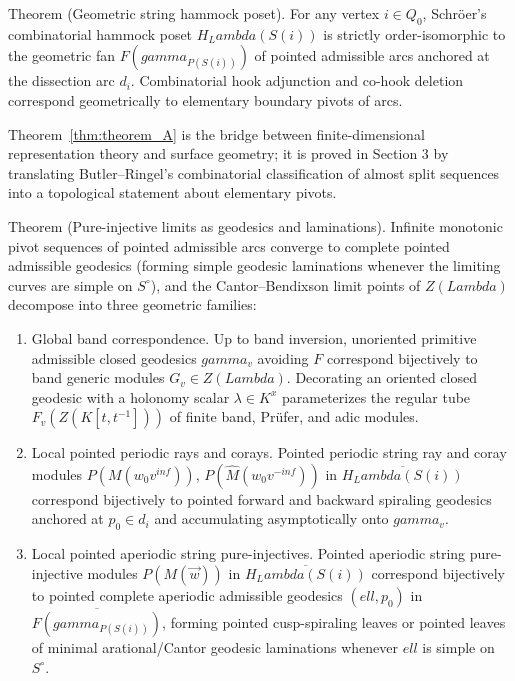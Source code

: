 \documentclass[11pt,a4paper,reqno]{amsart}
\def\mathcal#1{#1}%
\def\mathbb#1{#1}%
\def\operatorname#1{#1}%
\def\K{K}%
\def\forb{F}%
\def\Zg{Z}%
\def\PE{P}%
\def\times{x}%
\def\infty{inf}%
\def\gamma{gamma}%
\def\ell{ell}%
\def\Lambda{Lambda}%
\def\emph#1{#1}%
\def\textbf#1{#1}%
\theoremstyle{definition}
\theoremstyle{remark}
\newcommand{\K}{\mathbb{K}}
\newcommand{\Zg}{\operatorname{Zg}}
\newcommand{\PE}{\operatorname{PE}}
\newcommand{\forb}{\mathfrak{F}}
\begin{document}
\medskip
{}%
\noindent\textbf{Theorem  (Geometric string hammock poset).}%
\label{thm:theorem_A}
\emph{For any vertex $i \in Q_0$, Schr\"oer's combinatorial hammock poset $H_\Lambda(S(i))$ is strictly order-isomorphic to the geometric fan $\mathcal{F}(\gamma_{P(S(i))})$ of pointed admissible arcs anchored at the dissection arc $d_i$. Combinatorial hook adjunction and co-hook deletion correspond geometrically to elementary boundary pivots of arcs.}

\smallskip
Theorem~\ref{thm:theorem_A} is the bridge between finite-dimensional representation theory and surface geometry; it is proved in Section 3 by translating Butler--Ringel's combinatorial classification of almost split sequences into a topological statement about elementary pivots.

\medskip
{}%
\noindent\textbf{Theorem  (Pure-injective limits as geodesics and laminations).}%
\label{thm:theorem_B}
\emph{Infinite monotonic pivot sequences of pointed admissible arcs converge to complete pointed admissible geodesics (forming simple geodesic laminations whenever the limiting curves are simple on $\mathcal{S}^\circ$), and the Cantor--Bendixson limit points of $\Zg(\Lambda)$ decompose into three geometric families:
\begin{enumerate}[label=(\arabic*), leftmargin=*]
\item \textbf{Global band correspondence.} Up to band inversion, unoriented primitive admissible closed geodesics $\gamma_v$ avoiding $\forb$ correspond bijectively to band generic modules $G_v \in \Zg(\Lambda)$. Decorating an oriented closed geodesic with a holonomy scalar $\lambda \in \K^\times$ parameterizes the regular tube $F_v(\Zg(\K[t, t^{-1}]))$ of finite band, Pr\"ufer, and adic modules.
\item \textbf{Local pointed periodic rays and corays.} Pointed periodic string ray and coray modules $\PE(M(w_0 v^{\infty}))$, $\PE(\widehat{M}(w_0 v^{-\infty}))$ in $\overline{H_\Lambda(S(i))}$ correspond bijectively to pointed forward and backward spiraling geodesics anchored at $p_0 \in d_i$ and accumulating asymptotically onto $\gamma_v$.
\item \textbf{Local pointed aperiodic string pure-injectives.} Pointed aperiodic string pure-injective modules $\PE(M(\vec{w}))$ in $\overline{H_\Lambda(S(i))}$ correspond bijectively to pointed complete aperiodic admissible geodesics $(\ell, p_0)$ in $\overline{\mathcal{F}(\gamma_{P(S(i))})}$, forming pointed cusp-spiraling leaves or pointed leaves of minimal arational/Cantor geodesic laminations whenever $\ell$ is simple on $\mathcal{S}^\circ$.
\end{enumerate}}
\end{document}
